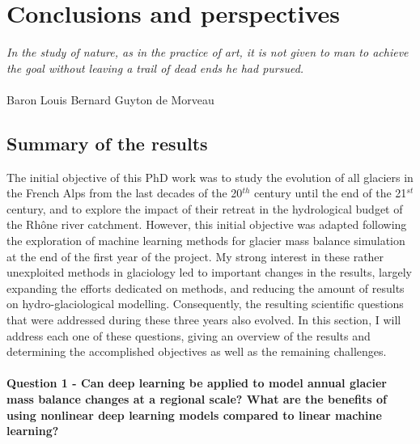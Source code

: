 \chapter{Conclusions and perspectives}
\label{chap:discussion}

\begin{flushright}
\begin{small}
\textit{In the study of nature, as in the practice of art, it is not given to man to achieve the goal without leaving a trail of dead ends he had pursued.}\\ \\
Baron Louis Bernard Guyton de Morveau
\end{small}
\end{flushright}

\section{Summary of the results}

The initial objective of this PhD work was to study the evolution of all glaciers in the French Alps from the last decades of the 20$^{th}$ century until the end of the 21$^{st}$ century, and to explore the impact of their retreat in the hydrological budget of the Rhône river catchment. However, this initial objective was adapted following the exploration of machine learning methods for glacier mass balance simulation at the end of the first year of the project. My strong interest in these rather unexploited methods in glaciology led to important changes in the results, largely expanding the efforts dedicated on methods, and reducing the amount of results on hydro-glaciological modelling. Consequently, the resulting scientific questions that were addressed during these three years also evolved. In this section, I will address each one of these questions, giving an overview of the results and determining the accomplished objectives as well as the remaining challenges.

\subsubsection{Question 1 - Can deep learning be applied to model annual glacier mass balance changes at a regional scale? What are the benefits of using nonlinear deep learning models compared to linear machine learning?}

